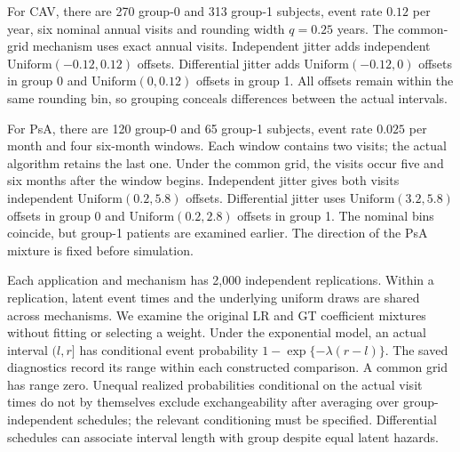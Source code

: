 \documentclass[12pt]{article}
\theoremstyle{definition}
\theoremstyle{remark}
\begin{document}
For CAV, there are 270 group-0 and 313 group-1 subjects, event rate $0.12$ per year, six nominal annual visits and rounding width $q=0.25$ years. The common-grid mechanism uses exact annual visits. Independent jitter adds independent $\mathrm{Uniform}(-0.12,0.12)$ offsets. Differential jitter adds $\mathrm{Uniform}(-0.12,0)$ offsets in group 0 and $\mathrm{Uniform}(0,0.12)$ offsets in group 1. All offsets remain within the same rounding bin, so grouping conceals differences between the actual intervals.

For PsA, there are 120 group-0 and 65 group-1 subjects, event rate $0.025$ per month and four six-month windows. Each window contains two visits; the actual algorithm retains the last one. Under the common grid, the visits occur five and six months after the window begins. Independent jitter gives both visits independent $\mathrm{Uniform}(0.2,5.8)$ offsets. Differential jitter uses $\mathrm{Uniform}(3.2,5.8)$ offsets in group 0 and $\mathrm{Uniform}(0.2,2.8)$ offsets in group 1. The nominal bins coincide, but group-1 patients are examined earlier. The direction of the PsA mixture is fixed before simulation.

Each application and mechanism has 2,000 independent replications. Within a replication, latent event times and the underlying uniform draws are shared across mechanisms. We examine the original LR and GT coefficient mixtures without fitting or selecting a weight. Under the exponential model, an actual interval $(l,r]$ has conditional event probability $1-\exp\{-\lambda(r-l)\}$. The saved diagnostics record its range within each constructed comparison. A common grid has range zero. Unequal realized probabilities conditional on the actual visit times do not by themselves exclude exchangeability after averaging over group-independent schedules; the relevant conditioning must be specified. Differential schedules can associate interval length with group despite equal latent hazards.
\end{document}
